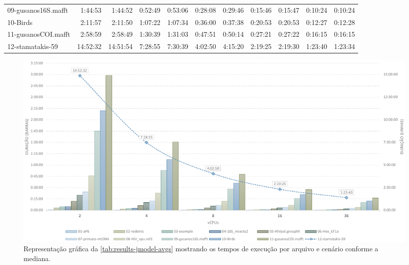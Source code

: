 \documentclass[english,brazilian]{UNISINOSmonografia} %
\begin{document}
{\begin{landscape}
\begin{table}
\begin{minipage}{1.1\linewidth}
\begin{tabular*}{\linewidth}{@{\extracolsep{\fill}}lrrrrrrrrrr@{}}
09-gusanos16S.mafft & 1:44:53 & 1:44:52 & 0:52:49 & 0:53:06 & 0:28:08 & 0:29:46 & 0:15:46 & 0:15:47 & 0:10:24 & 0:10:24 \\
10-Birds & 2:11:57 & 2:11:50 & 1:07:22 & 1:07:34 & 0:36:00 & 0:37:38 & 0:20:53 & 0:20:53 & 0:12:27 & 0:12:28 \\
11-gusanosCOI.mafft & 2:58:59 & 2:58:49 & 1:30:39 & 1:31:03 & 0:47:51 & 0:50:14 & 0:27:21 & 0:27:22 & 0:16:15 & 0:16:15 \\
12-stamatakis-59 & 14:52:32 & 14:51:54 & 7:28:55 & 7:30:39 & 4:02:50 & 4:15:20 & 2:19:25 & 2:19:30 & 1:23:40 & 1:23:34 \\ 
\bottomrule
				\end{tabular*}
			\end{minipage}
		\end{table}
		
		\begin{figure}
			\centering%
			\begin{minipage}{1.1\linewidth}
				\caption{Representação gráfica da \autoref{tab:results-jmodel-avgs} mostrando os tempos de execução por arquivo e cenário conforme a mediana.}
				\label{fig:results-jmodel-avgs}
				\vspace{1ex}
				\includegraphics[width=\linewidth]{results-jmodel-avgs}
			\end{minipage}
		\end{figure}
		
	\end{landscape}
}
\end{document}
